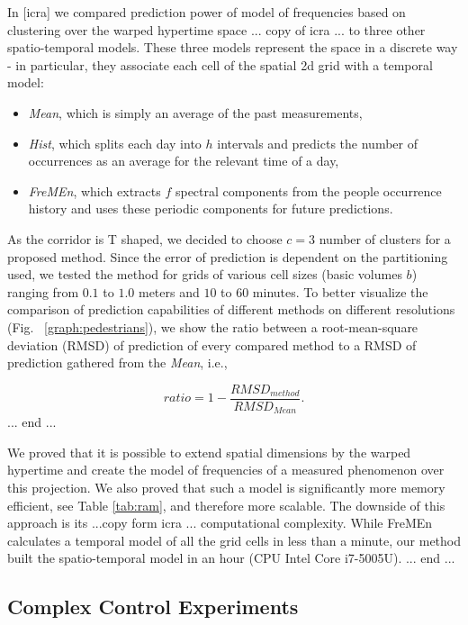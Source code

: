 In [icra] we compared prediction power of model of frequencies based on clustering over the warped hypertime space 
... copy of icra ... to three other spatio-temporal models. 
These three models represent the space in a discrete way - in particular, they associate each cell of the spatial 2d grid with a temporal model: 
\begin{itemize}
	\item \textit{Mean}, which is simply an average of the past measurements, 
	\item \textit{Hist}, which splits each day into $h$ intervals and predicts the number of occurrences as an average for the relevant time of a day, 
	\item \textit{FreMEn}, which extracts $f$ spectral components from the people occurrence history and uses these periodic components for future predictions.
\end{itemize}
As the corridor is T shaped, we decided to choose $c = 3$ number of clusters for a proposed method. 
Since the error of prediction is dependent on the partitioning used, we tested the method for grids of various cell sizes (basic volumes $b$) ranging from $0.1$ to $1.0$ meters and $10$ to $60$ minutes.
To better visualize the comparison of prediction capabilities of different methods on different resolutions (Fig. ~\ref{graph:pedestrians}), we show the ratio between a root-mean-square deviation \cite{hyndman2006another} (RMSD) of prediction of every compared method to a RMSD of prediction gathered from the \textit{Mean}, i.e.,

\begin{equation}\label{eq:ratio}
ratio = 1 - \frac{RMSD_{method}}{RMSD_{Mean}}.
\end{equation}
... end ... 



We proved that it is possible to extend spatial dimensions by the warped hypertime and create the model of frequencies of a measured phenomenon over this projection.
We also proved that such a model is significantly more memory efficient, see Table \ref{tab:ram},  and therefore more scalable.
The downside of this approach is its ...copy form icra ... computational complexity.
While FreMEn calculates a temporal model of all the grid cells in less than a minute, our method built the spatio-temporal model in an hour (CPU Intel Core i7-5005U).
... end ...


\subsection{Complex Control Experiments}

